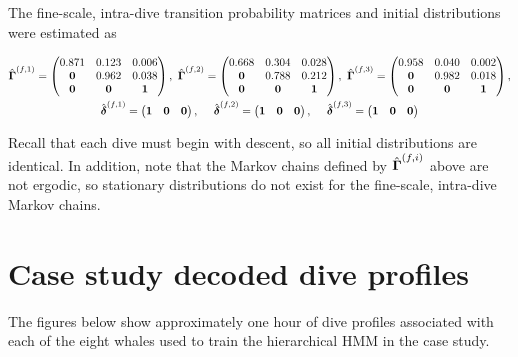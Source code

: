 \documentclass[12pt]{article}
\begin{document}
The fine-scale, intra-dive transition probability matrices and initial distributions were estimated as

\begin{gather}
    \hat {\boldsymbol{\Gamma}}^{(f,1)} = 
    \begin{pmatrix} 
    0.871 & 0.123 & 0.006 \\
    \bf{0} & 0.962 & 0.038 \\
    \bf{0} & \bf{0} & \bf{1}
    \end{pmatrix}, ~
    \hat {\boldsymbol{\Gamma}}^{(f,2)} = 
    \begin{pmatrix} 
    0.668 & 0.304 & 0.028 \\
    \bf{0} & 0.788 & 0.212 \\
    \bf{0} & \bf{0} & \bf{1}
    \end{pmatrix}, ~
    \hat {\boldsymbol{\Gamma}}^{(f,3)} = 
    \begin{pmatrix} 
    0.958 & 0.040 & 0.002 \\
    \bf{0} & 0.982 & 0.018 \\
    \bf{0} & \bf{0} & \bf{1}
    \end{pmatrix}, \\
    \hat {\boldsymbol{\delta}}^{(f,1)} = \begin{pmatrix} \bf{1} & \bf{0} & \bf{0} \end{pmatrix}, \quad ~
    \hat {\boldsymbol{\delta}}^{(f,2)} = \begin{pmatrix} \bf{1} & \bf{0} & \bf{0} \end{pmatrix}, \quad ~
    \hat {\boldsymbol{\delta}}^{(f,3)} = \begin{pmatrix} \bf{1} & \bf{0} & \bf{0} \end{pmatrix}
\end{gather}

Recall that each dive must begin with descent, so all initial distributions are identical. In addition, note that the Markov chains defined by $\hat {\boldsymbol{\Gamma}}^{(f,i)}$ above are not ergodic, so stationary distributions do not exist for the fine-scale, intra-dive Markov chains.

\section{Case study decoded dive profiles}

The figures below show approximately one hour of dive profiles associated with each of the eight whales used to train the hierarchical HMM in the case study.
\end{document}
